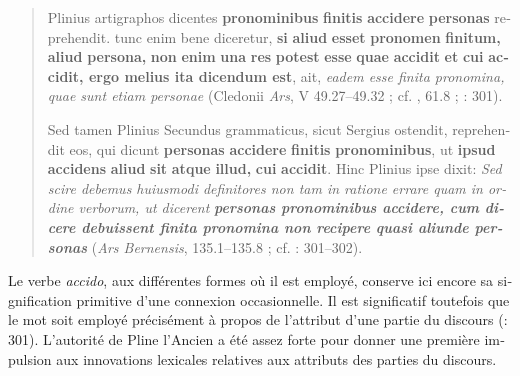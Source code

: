 \documentclass[output=paper]{langsci/langscibook}
\begin{document}
\begin{otherlanguage}{french}
\begin{quote}
    Plinius artigraphos dicentes \textbf{pronominibus} \textbf{finitis} \textbf{accidere} \textbf{personas} reprehendit. tunc enim bene diceretur, \textbf{si} \textbf{aliud} \textbf{esset} \textbf{pronomen} \textbf{finitum,} \textbf{aliud} \textbf{persona,} \textbf{non} \textbf{enim} \textbf{una} \textbf{res} \textbf{potest} \textbf{esse} \textbf{quae} \textbf{accidit} \textbf{et} \textbf{cui} \textbf{accidit, ergo melius ita dicendum est}, ait, \textit{eadem esse finita pronomina, quae sunt etiam personae} (Cledonii \textit{Ars},  V 49.27--49.32 ; cf. , 61.8 ; \citealt{della_casa_il_1969}: 301).
    
    Sed tamen Plinius Secundus grammaticus, sicut Sergius ostendit, reprehendit eos, qui dicunt \textbf{personas} \textbf{accidere} \textbf{finitis} \textbf{pronominibus}, ut \textbf{ipsud} \textbf{accidens} \textbf{aliud} \textbf{sit} \textbf{atque} \textbf{illud,} \textbf{cui} \textbf{accidit}. Hinc Plinius ipse dixit: \textit{Sed scire debemus huiusmodi definitores non tam in ratione errare quam in ordine verborum, ut dicerent} \textbf{\textit{personas pronominibus accidere, cum dicere debuissent finita pronomina non recipere quasi aliunde personas}} (\textit{Ars Bernensis},  135.1--135.8 ; cf. \citealt{della_casa_il_1969}: 301–302).
\end{quote}

Le verbe \textit{accido}, aux différentes formes où il est employé, conserve ici encore sa signification primitive d’une connexion occasionnelle. Il est significatif toutefois que le mot soit employé précisément à propos de l’attribut d’une partie du discours (\citealt{della_casa_il_1969}: 301). L’autorité de Pline l’Ancien a été assez forte pour donner une première impulsion aux innovations lexicales relatives aux attributs des parties du discours.


\end{otherlanguage}
\end{document}
